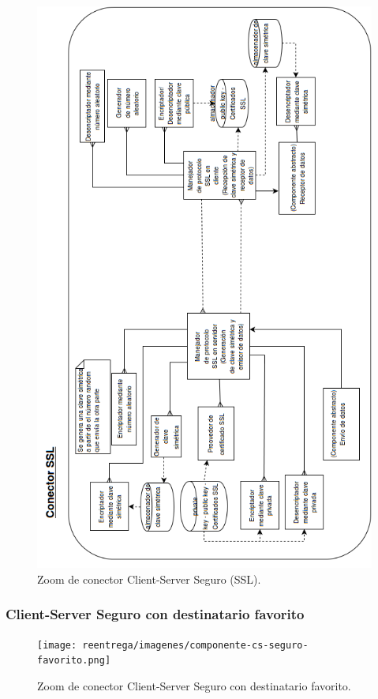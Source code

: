 \begin{figure}[H]
   \centering
   \includegraphics[height=0.95\textheight]{reentrega/imagenes/conector-ssl.png}
   \caption{Zoom de conector Client-Server Seguro (SSL).}
\end{figure}


\subsubsection{Client-Server Seguro con destinatario favorito}

\begin{figure}[H]
   \centering
   \texttt{[image: reentrega/imagenes/componente-cs-seguro-favorito.png]}
   \caption{Zoom de conector Client-Server Seguro con destinatario favorito.}
\end{figure}


